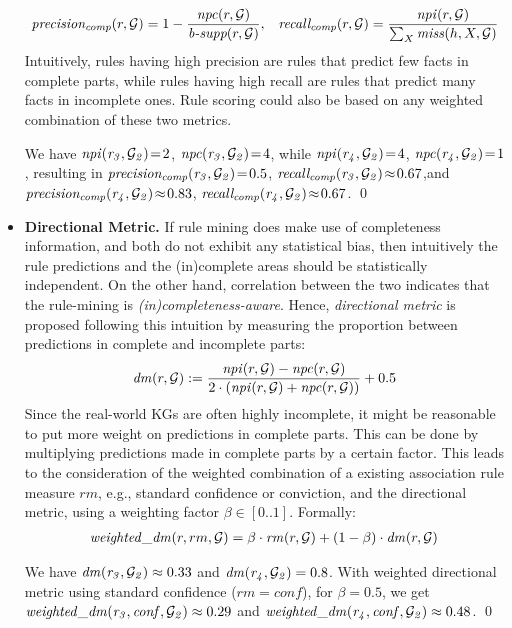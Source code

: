 \begin{itemize}
\begin{align*}
\mathit{precision_{comp}}(r,\mathcal{G})=1-\frac{\mathit{npc}(r,\mathcal{G})}{\textit{b-supp}(r,\mathcal{G})},\;\;\;
\mathit{recall_{comp}}(r,\mathcal{G})=\frac{\mathit{npi}(r,\mathcal{G})}{\sum_X \mathit{miss}(h,X,\mathcal{G})}
\end{align*}
Intuitively, rules having high precision are rules that predict few facts in complete parts, while rules having high recall are rules that predict many facts in incomplete ones. Rule scoring could also be based on any weighted combination of these two metrics.
\begin{example}
We have $\mathit{npi(r_3, \mathcal{G}_2)}\!=\!2$, $\mathit{npc(r_3, \mathcal{G}_2)}\!=\!4$, while $\mathit{npi(r_4,\mathcal{G}_2)}\!=\!4$, $\mathit{npc(r_4,\mathcal{G}_2)}\!=\!1$, resulting in $\mathit{precision_{comp}(r_3,\mathcal{G}_2)}\!=\!0.5$, $\mathit{recall_{comp}(r_3,\mathcal{G}_2)}\!\approx\!0.67$,and $\mathit{precision_{comp}(r_4,\mathcal{G}_2)}\!\approx\!0.83$, $\mathit{recall_{comp}(r_4,\mathcal{G}_2)}\!\approx\!0.67$.
\qed
\end{example}
\item \textbf{Directional Metric.} If rule mining does make use of completeness information, and both do not exhibit any statistical bias, then intuitively the rule predictions and the (in)complete areas should be statistically independent. On the other hand, correlation between the two indicates that the rule-mining is \emph{(in)completeness-aware}. Hence, \emph{directional metric} is proposed following this intuition by measuring the proportion between predictions in complete and incomplete parts:
\begin{align*}
\mathit{dm}(r,\mathcal{G}) := \frac{\mathit{npi}(r,\mathcal{G})-\mathit{npc}(r,\mathcal{G})}{2\cdot(\mathit{npi}(r,\mathcal{G})+\mathit{npc}(r,\mathcal{G}))}+0.5
\end{align*}
Since the real-world KGs are often highly incomplete, it might be reasonable to put more weight on predictions in complete parts. This can be done by multiplying predictions made in complete parts by a certain factor. This leads to the consideration of the weighted combination of a existing association rule measure $rm$, e.g., standard confidence or conviction, and 
the directional metric, using a weighting factor $\beta \in [0..1]$. Formally:
\begin{align*}
\mathit{weighted\_dm}(r,rm,\mathcal{G})=\beta \cdot \mathit{rm}(r,\mathcal{G}) + (1-\beta) \cdot \mathit{dm}(r,\mathcal{G}) 
\end{align*}
\begin{example}
We have $\mathit{dm(r_3,\mathcal{G}_2)}\approx 0.33$ and $\mathit{dm(r_4,\mathcal{G}_2)}=0.8$. With weighted directional metric using standard confidence ($rm = conf$), for $\beta=0.5$, we get $\mathit{weighted\_dm(r_3,conf,\mathcal{G}_2)} \approx 0.29$ and $\mathit{weighted\_dm(r_4,conf,\mathcal{G}_2)} \approx 0.48$. \qed
\end{example}
\end{itemize}

